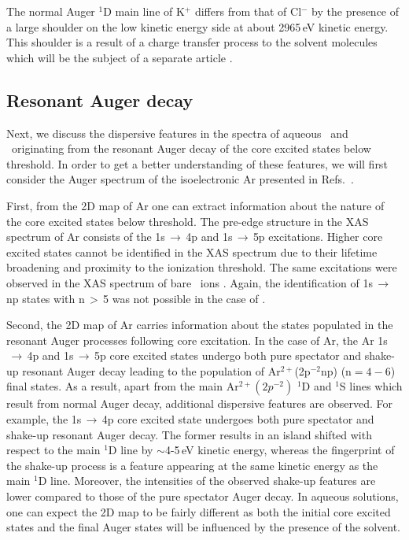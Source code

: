 The normal Auger $^1$D main line of K$^{+}$ differs from that of Cl$^{-}$ by the presence of a large shoulder on the low kinetic energy side at about 2965\,eV kinetic energy. This shoulder is a result of a charge transfer process to the solvent molecules which will be the subject of a separate article \citep{ceolin17}.


\subsection{Resonant Auger decay} \label{ssec:ra}
Next, we discuss the dispersive features in the spectra of aqueous \ki~and \cli~originating from the resonant Auger decay of the core excited states below threshold. In order to get a better understanding of these features, we will first consider the Auger spectrum of the isoelectronic Ar presented in Refs.\ \citep{ceolin15:022502,guillemin15:012503}. 


First, from the 2D map of Ar one can extract information about the nature of the core excited states below threshold. The pre-edge structure in the XAS spectrum of Ar consists of the 1s$\,\rightarrow\,$4p and 1s$\,\rightarrow\,$5p excitations. Higher core excited states cannot be identified in the XAS spectrum due to their lifetime broadening and proximity to the ionization threshold. The same excitations were observed in the XAS spectrum of bare \ki~ions \citep{hertlein06:062715}. Again, the identification of 1s$\,\rightarrow\,$np states with n$\,>\,$5 was not possible in the case of \ki.


Second, the 2D map of Ar carries information about the states populated in the resonant Auger processes following core excitation. In the case of Ar, the Ar 1s$\,\rightarrow\,$4p and 1s$\,\rightarrow\,$5p core excited states undergo both pure spectator and shake-up resonant Auger decay leading to the population of Ar$^{2+}$(2p$^{-2}$np) (n$ = 4 - 6$) final states. As a result, apart from the main Ar$^{2+}(2p^{-2})$ $^1$D and $^1$S lines which result from normal Auger decay, additional dispersive features are observed. For example, the 1s$\,\rightarrow\,$4p core excited state undergoes both pure spectator and shake-up resonant Auger decay. The former results in an island shifted with respect to the main $^1$D line by $\sim$4-5\,eV kinetic energy, whereas the fingerprint of the shake-up process is a feature appearing at the same kinetic energy as the  main $^1$D line. Moreover, the intensities of the observed shake-up features are lower compared to those of the pure spectator Auger decay. In aqueous solutions, one can expect the 2D map to be fairly different as both the initial core excited states and the final Auger states will be influenced by the presence of the solvent.


